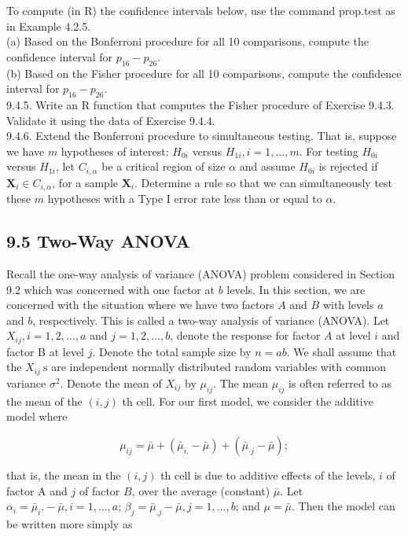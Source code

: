 To compute (in R) the confidence intervals below, use the command prop.test as in Example 4.2.5.\\
(a) Based on the Bonferroni procedure for all 10 comparisons, compute the confidence interval for $p_{16}-p_{26}$.\\
(b) Based on the Fisher procedure for all 10 comparisons, compute the confidence interval for $p_{16}-p_{26}$.\\
9.4.5. Write an R function that computes the Fisher procedure of Exercise 9.4.3. Validate it using the data of Exercise 9.4.4.\\
9.4.6. Extend the Bonferroni procedure to simultaneous testing. That is, suppose we have $m$ hypotheses of interest: $H_{0 i}$ versus $H_{1 i}, i=1, \ldots, m$. For testing $H_{0 i}$ versus $H_{1 i}$, let $C_{i, \alpha}$ be a critical region of size $\alpha$ and assume $H_{0 i}$ is rejected if $\mathbf{X}_{i} \in C_{i, \alpha}$, for a sample $\mathbf{X}_{i}$. Determine a rule so that we can simultaneously test these $m$ hypotheses with a Type I error rate less than or equal to $\alpha$.

\subsection*{9.5 Two-Way ANOVA}
Recall the one-way analysis of variance (ANOVA) problem considered in Section 9.2 which was concerned with one factor at $b$ levels. In this section, we are concerned with the situation where we have two factors $A$ and $B$ with levels $a$ and $b$, respectively. This is called a two-way analysis of variance (ANOVA). Let $X_{i j}, i=1,2, \ldots, a$ and $j=1,2, \ldots, b$, denote the response for factor $A$ at level $i$ and factor B at level $j$. Denote the total sample size by $n=a b$. We shall assume that the $X_{i j} \mathrm{~s}$ are independent normally distributed random variables with common variance $\sigma^{2}$. Denote the mean of $X_{i j}$ by $\mu_{i j}$. The mean $\mu_{i j}$ is often referred to as the mean of the $(i, j)$ th cell. For our first model, we consider the additive model where


\begin{equation*}
\mu_{i j}=\bar{\mu}+\left(\bar{\mu}_{i .}-\bar{\mu}\right)+\left(\bar{\mu}_{\cdot j}-\bar{\mu}\right) ; \tag{9.5.1}
\end{equation*}


that is, the mean in the $(i, j)$ th cell is due to additive effects of the levels, $i$ of factor A and $j$ of factor $B$, over the average (constant) $\bar{\mu}$. Let $\alpha_{i}=\bar{\mu}_{i} .-\bar{\mu}, i=1, \ldots, a$; $\beta_{j}=\bar{\mu}_{. j}-\bar{\mu}, j=1, \ldots, b$; and $\mu=\bar{\mu}$. Then the model can be written more simply as


